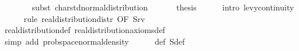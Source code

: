 \documentclass{svjour3}
\begin{document}
{\begin{isabellebody}
\ \ \ \ \ \ \isamarkupfalse%
\ {\isacharparenleft}subst\ char{\isacharunderscore}std{\isacharunderscore}normal{\isacharunderscore}distribution{\isacharparenright}\isanewline
\ \ \isamarkupfalse%
\isanewline
\ \ \isamarkupfalse%
\ {\isacharquery}thesis\isanewline
\ \ \ \ \isamarkupfalse%
\ {\isacharparenleft}intro\ levy{\isacharunderscore}continuity{\isacharparenright}\isanewline
\ \ \ \ \isamarkupfalse%
\ {\isacharparenleft}rule\ real{\isacharunderscore}distribution{\isacharunderscore}distr\ {\isacharbrackleft}OF\ S{\isacharunderscore}rv{\isacharbrackright}{\isacharparenright}\isanewline
\ \ \ \ \isamarkupfalse%
\ real{\isacharunderscore}distribution{\isacharunderscore}def\ real{\isacharunderscore}distribution{\isacharunderscore}axioms{\isacharunderscore}def\isanewline
\ \ \ \ \isamarkupfalse%
\ {\isacharparenleft}simp\ add{\isacharcolon}\ prob{\isacharunderscore}space{\isacharunderscore}normal{\isacharunderscore}density{\isacharparenright}\isanewline
\ \ \ \ \isamarkupfalse%
\ {\isasymphi}{\isacharunderscore}def\ S{\isacharprime}{\isacharunderscore}def\ \isamarkupfalse%
\ {\isacharminus}\isanewline
{}
\end{isabellebody}
}
\end{document}

